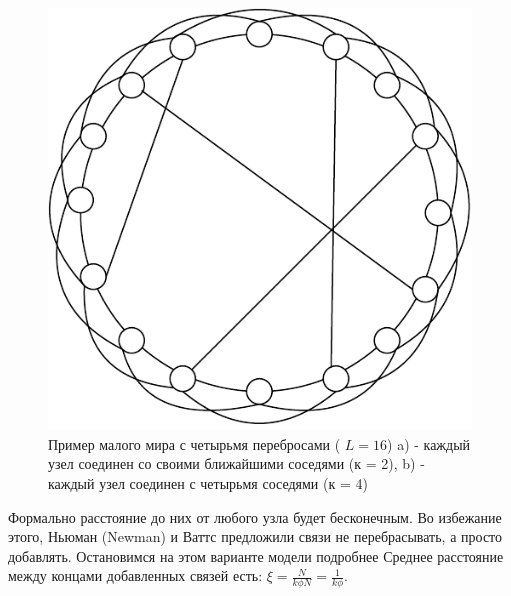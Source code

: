 \documentclass[a4paper]{article}
\begin{document}
\begin{figure}[H]
\begin{center}
\begin{minipage}[h]{0.4\linewidth}
	\includegraphics[width=1\linewidth]{3neighbours.pdf}
	\end{minipage}
        \caption{Пример малого мира с четырьмя перебросами ( $L = 16$) a) - каждый узел соединен со своими ближайшими соседями (к = 2), b) - каждый узел соединен с четырьмя соседями (к = 4)}
    \end{center}
    \label{p2}
\end{figure}



Формально расстояние до них от любого узла будет бесконечным. Во избежание этого, Ньюман (Newman) и Ваттс предложили связи не перебрасывать, а просто добавлять. Остановимся на этом варианте модели подробнее Среднее расстояние между концами добавленных
связей есть: $\xi = \frac{N}{k\phi N} = \frac{1}{k\phi}$.
\end{document}
